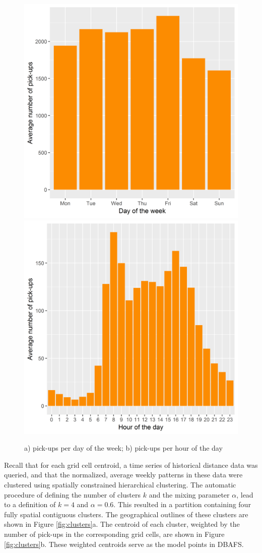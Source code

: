 \documentclass[12pt,oneside]{reedthesis}
\begin{document}
\begin{figure}[H]
\includegraphics[width=0.5\linewidth]{Figures/usageday} \includegraphics[width=0.5\linewidth]{Figures/usagehour} \caption{a) pick-ups per day of the week; b) pick-ups per hour of the day}\label{fig:usageplots}
\end{figure}
Recall that for each grid cell centroid, a time series of historical
distance data was queried, and that the normalized, average weekly
patterns in these data were clustered using spatially constrained
hierarchical clustering. The automatic procedure of defining the number
of clusters \(k\) and the mixing parameter \(\alpha\), lead to a
definition of \(k = 4\) and \(\alpha = 0.6\). This resulted in a
partition containing four fully spatial contiguous clusters. The
geographical outlines of these clusters are shown in Figure
\ref{fig:clusters}a. The centroid of each cluster, weighted by the
number of pick-ups in the corresponding grid cells, are shown in Figure
\ref{fig:clusters}b. These weighted centroids serve as the model points
in DBAFS.
\end{document}
